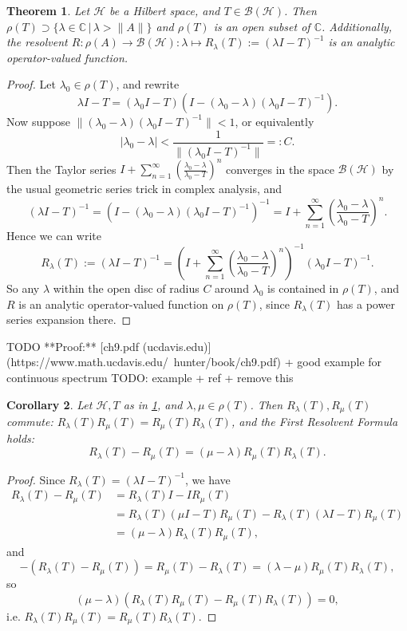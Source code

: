 \documentclass[12pt,oneside]{report}
\newtheorem{thm}{Theorem}[chapter]
\newtheorem{cor}[thm]{Corollary}
\begin{document}
\begin{thm}\label{resolvent-analytic}
    Let $\mathscr{H}$ be a Hilbert space, and $T \in \mathscr{B}(\mathscr{H})$. Then $\rho(T) \supset \{ \lambda \in \mathbb{C} \, | \, \lambda > \|A\| \}$ and $\rho(T)$ is an open subset of $\mathbb{C}$. Additionally, the resolvent $R: \rho(A) \to \mathscr{B}(\mathscr{H}): \lambda \mapsto R_{\lambda}(T) := (\lambda I - T)^{-1}$ is an analytic operator-valued function.
\end{thm}
\begin{proof}
    Let $\lambda_{0} \in \rho(T)$, and rewrite $$\lambda I - T = (\lambda_{0}I - T)(I - (\lambda_{0} - \lambda)(\lambda_{0}I - T)^{-1}).$$ Now suppose $\|(\lambda_{0} - \lambda)(\lambda_{0}I - T)^{-1}\| < 1$, or equivalently $$|\lambda_{0}-\lambda| < \frac{1}{\|(\lambda_{0}I - T)^{-1}\|} =: C.$$ Then the Taylor series $I + \sum_{n=1}^{\infty}\left(\frac{\lambda_{0}-\lambda}{\lambda_{0}-T}\right)^{n}$ converges in the space $\mathscr{B}(\mathscr{H})$ by the usual geometric series trick in complex analysis, and $$(\lambda I - T)^{-1} = (I - (\lambda_{0} - \lambda)(\lambda_{0} I - T)^{-1})^{-1} = I + \sum_{n=1}^{\infty}\left(\frac{\lambda_{0}-\lambda}{\lambda_{0}-T}\right)^{n}.$$ Hence we can write $$R_{\lambda}(T) := (\lambda I - T)^{-1} = \left(I + \sum_{n=1}^{\infty}\left(\frac{\lambda_{0}-\lambda}{\lambda_{0}-T}\right)^{n}\right)^{-1}(\lambda_{0}I - T)^{-1}.$$ So any $\lambda$ within the open disc of radius $C$ around $\lambda_{0}$ is contained in $\rho(T)$, and $R$ is an analytic operator-valued function on $\rho(T)$, since $R_{\lambda}(T)$ has a power series expansion there.
\end{proof}
TODO **Proof:** [ch9.pdf (ucdavis.edu)](https://www.math.ucdavis.edu/~hunter/book/ch9.pdf) + good example for continuous spectrum TODO: example + ref + remove this

\begin{cor}\label{first-resolvent-formula}
    Let $\mathscr{H}, T$ as in \ref{resolvent-analytic}, and $\lambda,\mu \in \rho(T)$. Then $R_{\lambda}(T), R_{\mu}(T)$ commute: $R_{\lambda}(T)R_{\mu}(T) = R_{\mu}(T)R_{\lambda}(T)$, and the First Resolvent Formula holds: $$R_{\lambda}(T) - R_{\mu}(T) = (\mu - \lambda)R_{\mu}(T)R_{\lambda}(T).$$
\end{cor}
\begin{proof}
    Since $R_{\lambda}(T) = (\lambda I - T)^{-1}$,  we have 
\begin{align*}
R_{\lambda}(T) - R_{\mu}(T) &= R_{\lambda}(T)I - IR_{\mu}(T) \\
&= R_{\lambda}(T)(\mu I - T)R_{\mu}(T) - R_{\lambda}(T)(\lambda I - T)R_{\mu}(T) \\
&= (\mu-\lambda)R_{\lambda}(T)R_{\mu}(T),
\end{align*} and $$- (R_{\lambda}(T) - R_{\mu}(T)) = R_{\mu}(T) - R_{\lambda}(T) = (\lambda-\mu)R_{\mu}(T)R_{\lambda}(T),$$ so $$(\mu - \lambda)(R_{\lambda}(T)R_{\mu}(T) - R_{\mu}(T)R_{\lambda}(T)) = 0,$$ i.e. $R_{\lambda}(T)R_{\mu}(T) = R_{\mu}(T)R_{\lambda}(T)$.
\end{proof}
\end{document}
